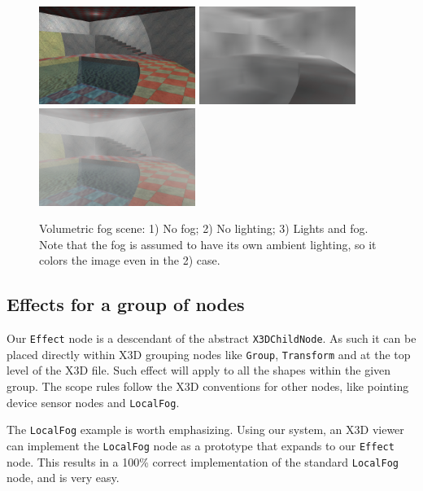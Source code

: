 \documentclass{egpubl}
\begin{document}
\begin{figure}[t]
  \centering
  \includegraphics[width=2.0in]{volumetric_animated_fog_no_fog}
  \includegraphics[width=2.0in]{volumetric_animated_fog_no_light}
  \includegraphics[width=2.0in]{volumetric_animated_fog_all}
  \caption{Volumetric fog scene: 1) No fog; 2) No lighting; 3) Lights and fog.
Note that the fog is assumed to have its own ambient lighting,
so it colors the image even in the 2) case.}
  \label{fig_fog}
\end{figure}

\subsection{Effects for a group of nodes}

Our \texttt{Effect} node is a descendant of the abstract \texttt{X3DChildNode}.
As such it can be placed directly within X3D grouping nodes like
\texttt{Group}, \texttt{Transform} and at the top level of the X3D file.
Such effect will apply to all the shapes within the given group.
The scope rules follow the X3D conventions for other nodes,
like pointing device sensor nodes and \texttt{LocalFog}.

The \texttt{LocalFog} example is worth emphasizing. Using our system,
an X3D viewer can implement the \texttt{LocalFog} node as a prototype
that expands to our \texttt{Effect} node. This results in a 100\% correct
implementation of the standard \texttt{LocalFog} node, and is very easy.
\end{document}
